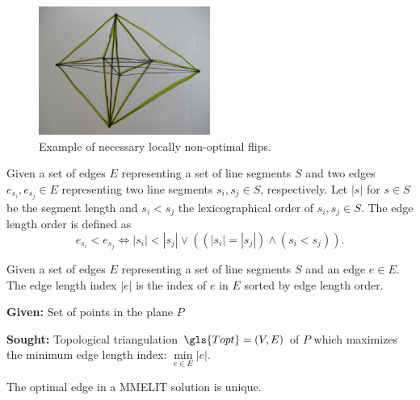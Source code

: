 \begin{figure}[ht]
  \centering
  \includegraphics[width=0.5\textwidth]{img/example_nonoptimal_flips.jpg}
  \caption{Example of necessary locally non-optimal flips.\label{fig:nonoptimal_flips}}
\end{figure}

\begin{definition}
  Given a set of edges \(E\) representing a set of line segments
  \(S\) and two edges \(e_{s_i}, e_{s_j} \in E\) representing two
  line segments \(s_i,s_j \in S\), respectively. Let \(|s|\) for
  \(s \in S\) be the segment length and \( s_i < s_j \) the
  lexicographical order of \(s_i, s_j \in S\). The edge length
  order is defined as  
  \[
    e_{s_i} < e_{s_j}
    \iff |s_i| < |s_j|
    \lor ((|s_i| = |s_j|) \land (s_i < s_j)).
  \]
\end{definition}

\begin{definition}
  Given a set of edges \(E\) representing a set of line segments
  \(S\) and an edge \(e \in E\). The edge length index \(|e|\) is the
  index of \(e\) in \(E\) sorted by edge length order.
\end{definition}

\begin{problem}
  \hfill
  \begin{labeling}{\hspace{4em}}
    \item[\textbf{Given:}]
      Set of points in the plane \(P\)
    \item[\textbf{Sought:}]
      Topological triangulation \(\gls{Topt} = (V,E)\) of \(P\)
      which maximizes the minimum edge length index: 
      \(\min\limits_{e\in E} |e|\).
  \end{labeling}
\end{problem}

\begin{theorem}
  The optimal edge in a \gls{MMELIT} solution is unique.
\end{theorem}

